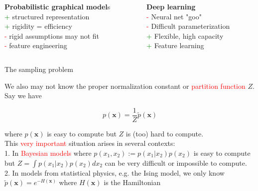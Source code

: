 \documentclass{beamer}					%
\begin{document}
\begin{frame}
\begin{columns}
\begin{column}{0.5\textwidth}
\textbf{Probabilistic graphical model}s\\
\vspace{0.1in}
\textcolor{green}{+} structured representation\\
\vspace{0.1in}
\textcolor{green}{+} rigidity = efficiency\\
\vspace{0.1in}
\textcolor{red}{-} rigid assumptions may not fit\\
\vspace{0.1in}
\textcolor{red}{-} feature engineering
\end{column}
\begin{column}{0.5\textwidth}  %
\begin{center}
\textbf{Deep learning}\\
\vspace{0.1in}
\textcolor{red}{-} Neural net "goo"\\
\vspace{0.1in}
\textcolor{red}{-} Difficult parameterization\\
\vspace{0.1in}
\textcolor{green}{+} Flexible, high capacity\\
\vspace{0.1in}
\textcolor{green}{+} Feature learning\\
\vspace{0.1in}
\end{center}
\end{column}
\end{columns}
\end{frame}

\begin{frame}{The sampling problem}

We also may not know the proper normalization constant or \textcolor{red}{partition function} $Z$. Say we have

\begin{equation*}
p(\mathbf{x}) = \frac{1}{Z}\tilde{p}(\mathbf{x})
\end{equation*}

where $p(\mathbf{x})$ is easy to compute but $Z$ is (too) hard to compute.\\
\vspace{0.1in}
This \textcolor{red}{very important} situation arises in several contexts:\\
\vspace{0.1in}
1. In \textcolor{red}{Bayesian models} where $p(x_{1},x_{2}) := p(x_{1}|x_{2})p(x_{2})$ is easy to compute but
$Z = \int p(x_{1}|x_{2})p(x_{2})dx_{2}$ can be very difficult or impossible to
compute.\\
\vspace{0.1in}
2. In models from statistical physics, e.g. the Ising model, we only know
$\tilde{p}(\mathbf{x}) = e^{−H(\mathbf{x})}$ where $H(\mathbf{x})$ is the Hamiltonian

\end{frame}
\end{document}
